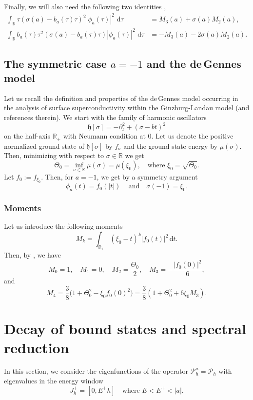 \documentclass[JEP,XML,SOM,Unicode,NoFloatCountersInSection,published]{cedram}
\newcommand{\rd}{\,\mathrm{d}}
\newcommand{\cP}{\mathcal{P}}
\theoremstyle{plain}
\theoremstyle{definition}
\newcommand{\R}{\mathbb{R}}
\begin{document}
Finally, we will also need the following two identities \cite[Rem.\,2.3]{AHK},
\begin{equation}\label{aqddid}
\begin{split}
\int_{\mathbb R}\tau(\sigma(a)-b_a(\tau) \tau)^2|\phi_a(\tau)|^2\,\rd \tau&=M_3(a) +\sigma(a)M_2(a),\\
\int_{\mathbb R}b_a(\tau) \tau^2(\sigma(a)-b_a(\tau) \tau)|\phi_a(\tau)|^2\,\rd \tau&=-M_3(a)-2\sigma(a)M_2(a).
\end{split}
\end{equation}

\subsection{The symmetric case $a=-1$ and the de\,Gennes model}\label{sec.dG}
Let us recall the definition and properties of the de\,Gennes model occurring in the analysis of surface superconductivity within the Ginzburg-Landau model \cite[\S 3.2]{FH10} (and references therein). We start with the family of harmonic oscillators
\[
\mathfrak h[\sigma]=-\partial_t^2+(\sigma-bt)^2
\]
on the half-axis $\R_+$ with Neumann condition at $0$. Let us denote the positive normalized ground state of $\mathfrak h[\sigma]$ by $f_{\sigma}$ and the ground state energy by $\mu(\sigma)$. Then, minimizing with respect to $\sigma\in\R$ we get
\[
\Theta_0=\inf_{\sigma\in\R}\mu(\sigma)=\mu(\xi_0),\quad\text{where~}\xi_0=\sqrt{\Theta_0}.
\]
Let $f_0:=f_{\xi_0}$. Then, for $a=-1$, we get by a symmetry argument
\[
\phi_a(t)=f_0(|t|)\,
\quad \text{and}\quad \sigma(-1) = \xi_0.
\]

\subsubsection*{Moments}
Let us introduce the following moments
\[
M_k=\int_{\R_+}(\xi_0-t)^k|f_0(t)|^2\rd t.
\]
Then, by \cite{FH06}, we have
\begin{equation}\label{eq:moments3}
M_0=1,\quad M_1=0,\quad M_2=\frac{\Theta_0}2 ,\quad M_3=-\frac{|f_0(0)|^2}{6},
\end{equation}
and
\[
M_4= \frac{3}{8}\bigl(1+\Theta_0^2-\xi_0f_0(0)^2 \bigr)=\frac38(1+\Theta_0^2+6\xi_0M_3).
\]

\section{Decay of bound states and spectral reduction}\label{sec:red}

In this section, we consider the eigenfunctions of the operator $\cP^a_h=\cP_h$ with eigenvalues in the energy window
\begin{equation}
J^+_h=[0,E^+h]\quad\text{where~} E<E^+<|a|.
\end{equation}
\end{document}
